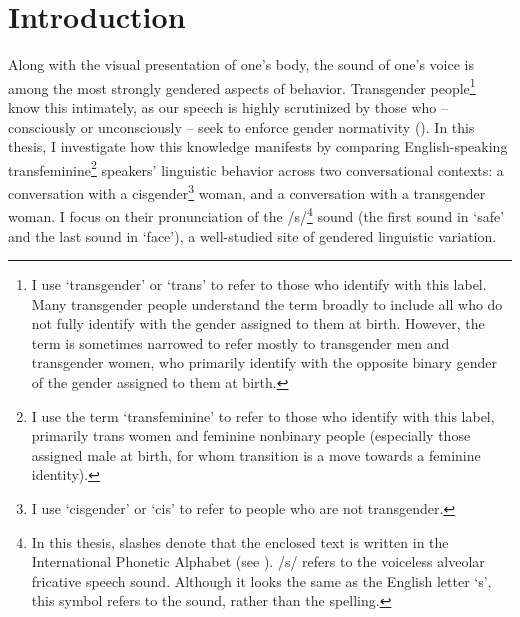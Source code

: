 \documentclass[12pt,twoside]{reedthesis}
\begin{document}

  \mainmatter %
  \pagestyle{fancyplain} %


    \chapter*{Introduction}

Along with the visual presentation of one's body, the sound of one's voice is among the most strongly gendered aspects of behavior. Transgender people\footnote{I use `transgender' or `trans' to refer to those who identify with this label. Many transgender people understand the term broadly to include all who do not fully identify with the gender assigned to them at birth. However, the term is sometimes narrowed to refer mostly to transgender men and transgender women, who primarily identify with the opposite binary gender of the gender assigned to them at birth.} know this intimately, as our speech is highly scrutinized by those who -- consciously or unconsciously -- seek to enforce gender normativity (\cite{jessee_cisgender_2025}). In this thesis, I investigate how this knowledge manifests by comparing English-speaking transfeminine\footnote{I use the term `transfeminine' to refer to those who identify with this label, primarily trans women and feminine nonbinary people (especially those assigned male at birth, for whom transition is a move towards a feminine identity).} speakers' linguistic behavior across two conversational contexts: a conversation with a cisgender\footnote{I use `cisgender' or `cis' to refer to people who are not transgender.} woman, and a conversation with a transgender woman. I focus on their pronunciation of the /s/\footnote{In this thesis, slashes denote that the enclosed text is written in the International Phonetic Alphabet (see \cite{international_phonetic_association_handbook_1999}). /s/ refers to the voiceless alveolar fricative speech sound. Although it looks the same as the English letter `s', this symbol refers to the sound, rather than the spelling.} sound (the first sound in `safe' and the last sound in `face'), a well-studied site of gendered linguistic variation.
	
\end{document}
